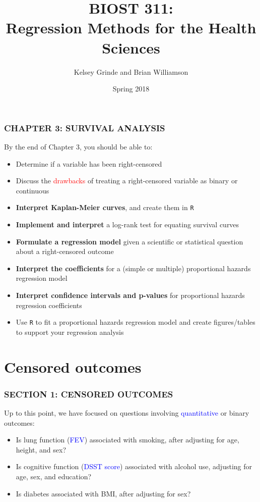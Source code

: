 \documentclass[12pt, 
hyperref={colorlinks=true, linkcolor=blue, urlcolor=cyan},dvipsnames]{beamer}
\title{BIOST 311: \\ Regression Methods for the Health Sciences}
\author{Kelsey Grinde and Brian Williamson}
\institute{UW Biostatistics}
\date{Spring 2018}
\begin{document}
\begin{frame}
\titlepage\thispagestyle{empty}
\end{frame}

  
\setcounter{framenumber}{\value{chap3}}

\begin{frame}
\frametitle{CHAPTER 3: SURVIVAL ANALYSIS}
By the end of Chapter 3, you should be able to: \vspace{-0.3cm}

\begin{itemize}
\item Determine if a variable has been \textcolor{BurntOrange}{right-censored}
\item Discuss the \textcolor{red}{drawbacks} of treating a right-censored variable as binary or continuous
\item \textbf{Interpret Kaplan-Meier curves}, and create them in \texttt{R}
\item \textbf{Implement and interpret} a log-rank test for equating survival curves
\item \textbf{Formulate a regression model} given a scientific or statistical question about a right-censored outcome
\item \textbf{Interpret the coefficients} for a (simple or multiple) proportional hazards regression model
\item \textbf{Interpret confidence intervals and p-values} for proportional hazards regression coefficients
\item Use \texttt{R} to fit a proportional hazards regression model and create figures/tables to support your regression analysis
\end{itemize}

\end{frame}

\section{Censored outcomes}
\begin{frame}
\frametitle{SECTION 1: CENSORED OUTCOMES}
Up to this point, we have focused on questions involving \textcolor{blue}{quantitative} or \textcolor{BurntOrange}{binary} outcomes: 
\begin{itemize}
\item Is lung function (\textcolor{blue}{FEV}) associated with smoking, after adjusting for age, height, and sex?
\item Is cognitive function (\textcolor{blue}{DSST score}) associated with alcohol use, adjusting for age, sex, and education?
\item Is \textcolor{BurntOrange}{diabetes} associated with BMI, after adjusting for sex?
\end{itemize}
\end{frame}
\end{document}
